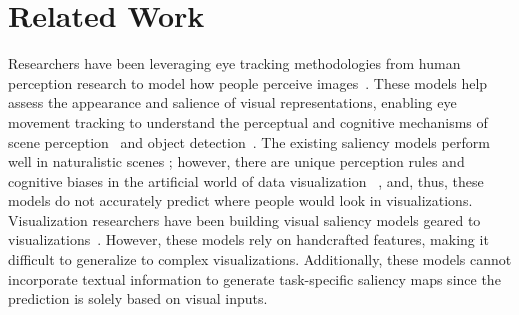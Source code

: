 \section{Related Work}
Researchers have been leveraging eye tracking methodologies from human perception research to model how people perceive images~\cite{shanmuga2015eye, bonhage2015combined, conklin2016using}.
These models help assess the appearance and salience of visual representations, enabling eye movement tracking to understand the perceptual and cognitive mechanisms of scene perception~\cite{itti1998model} and object detection~\cite{borji2015salient}.
The existing saliency models perform well in naturalistic scenes
; however, there are unique perception rules and cognitive biases in the artificial world of data visualization 
~\cite{franconeri2021science, correll2012comparing, polatsek2018exploring, knittel2024gridlines}, and, thus, these models do not accurately predict where people would look in visualizations. 
Visualization researchers have been building visual saliency models geared to visualizations~\cite{DVSaliencyModel2017Matzen, bylinskii2016should}. %
However, these models rely on handcrafted features, making it difficult to generalize to complex visualizations. Additionally, these models cannot incorporate textual information to generate task-specific saliency maps since the prediction is solely based on visual inputs.

